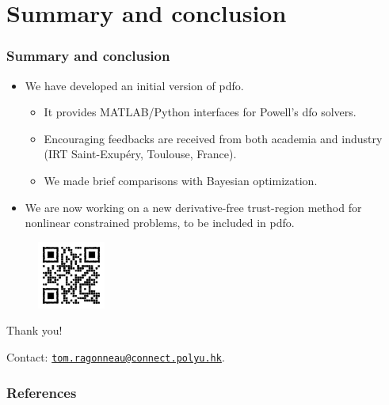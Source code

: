 \documentclass[usenames,dvipsnames,10pt]{beamer}
\begin{document}
\section{Summary and conclusion}

\begin{frame}
    \frametitle{Summary and conclusion}

    \begin{itemize}
        \setlength{\itemsep}{\bigskipamount}
        \item We have developed an \alert{initial version of \gls{pdfo}}.
        \begin{itemize}
            \item It provides \alert{MATLAB/Python interfaces} for Powell's \gls{dfo} solvers.
            \item \alert{Encouraging feedbacks} are received from both academia and industry (IRT Saint-Exup{\'{e}}ry, Toulouse, France).
            \item We made \alert{brief comparisons} with Bayesian optimization.
        \end{itemize}
        \item We are now working on a \alert{new derivative-free trust-region method} for nonlinear constrained problems, to be included in \gls{pdfo}.
    \end{itemize}

    \begin{minipage}{.29\textwidth}
        \begin{figure}
            \centering
            \includegraphics[width=6em]{pdfo.png}
        \end{figure}
    \end{minipage}
    \begin{minipage}{.69\textwidth}
        {\huge Thank you!}

        \medskip

        {\small Contact: \alert{\href{mailto:tom.ragonneau@connect.polyu.hk}{\texttt{tom.ragonneau@connect.polyu.hk}}}.}
    \end{minipage}
\end{frame}

\appendix

\begin{frame}[t,allowframebreaks]
    \frametitle{References}

    \printbibliography[heading=none]
\end{frame}
\end{document}
